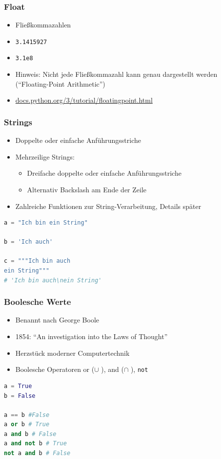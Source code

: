 \documentclass[ngerman]{beamer}
\begin{document}
\begin{frame}
\frametitle{Float}

\begin{itemize}
	\item Fließkommazahlen
	\item \texttt{3.1415927}
	\item \texttt{3.1e8}
	\item Hinweis: Nicht jede Fließkommazahl kann genau dargestellt werden (\enquote{Floating-Point Arithmetic}) 
	\item \url{docs.python.org/3/tutorial/floatingpoint.html}
\end{itemize}
\end{frame}

\begin{frame}[containsverbatim]
\frametitle{Strings}

\begin{itemize}
\item Doppelte oder einfache Anführungsstriche
\item Mehrzeilige Strings:

\begin{itemize}
	\item Dreifache doppelte oder einfache Anführungsstriche
	\item Alternativ Backslash am Ende der Zeile 
\end{itemize}

\item Zahlreiche Funktionen zur String-Verarbeitung, Details später
\end{itemize}


\begin{lstlisting}[language={Python}]
a = "Ich bin ein String"

b = 'Ich auch'

c = """Ich bin auch
ein String"""
# 'Ich bin auch\nein String'
\end{lstlisting}


\end{frame}

\begin{frame}[containsverbatim]
\frametitle{Boolesche Werte}

\begin{itemize}
	\item Benannt nach George Boole
	\item 1854: \enquote{An investigation into the Laws of Thought}
	\item Herzstück moderner Computertechnik
	\item Boolesche Operatoren or ($\cup$ ),  and ($\cap$ ), \texttt{not}
\end{itemize}

\begin{lstlisting}[language={Python}]
a = True
b = False 

a == b #False
a or b # True
a and b # False
a and not b # True
not a and b # False
\end{lstlisting}
\end{frame}
\end{document}
